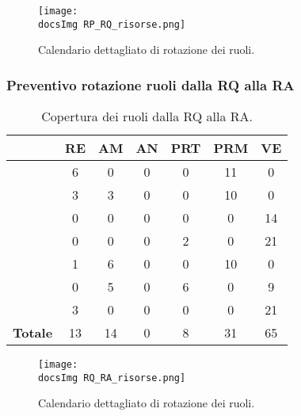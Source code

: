 {{{	\begin{figure}[h!]
	\centering
		\texttt{[image: \\docsImg RP\_RQ\_risorse.png]}
		\caption{Calendario dettagliato di rotazione dei ruoli.}		
	\end{figure} 	
	}
	\newpage
	\subsubsection{Preventivo rotazione ruoli dalla RQ alla RA}{
		\begin{table}[h!]
		\begin{center}
			\begin{tabular}{l c c c c c c}				
				\toprule
				&	RE& AM& AN& PRT& PRM& VE \\ 
				\midrule
				\BM	&	6	&	0	&	0	&	0	&	11	&	0\\ 
				\BA	&	3	&	3	&	0	&	0	&	10	&	0\\
				\CD	&	0	&	0	&	0	&	0	&	0	&	14\\ 
				\LS	&	0	&	0	&	0	&	2	&	0	&	21\\
				\PV &	1	&	6	&	0	&	0	&	10	&	0\\
				\ZF 	&	0	&	5	&	0	&	6	&	0	&	9\\
				\ZE &	3	&	0	&	0	&	0	&	0	&	21\\ \hline
				\textbf{Totale}&	 13 &	14 &		0	&	8 &		31 & 65\\
				\bottomrule
			\end{tabular}
		\end{center}	
		\caption{Copertura dei ruoli dalla RQ alla RA.}
	\end{table}	
	
	\begin{figure}[h!]
	\centering
	\texttt{[image: \\docsImg RQ\_RA\_risorse.png]}
		\caption{Calendario dettagliato di rotazione dei ruoli.}		
	\end{figure} 
		}
	}
}

